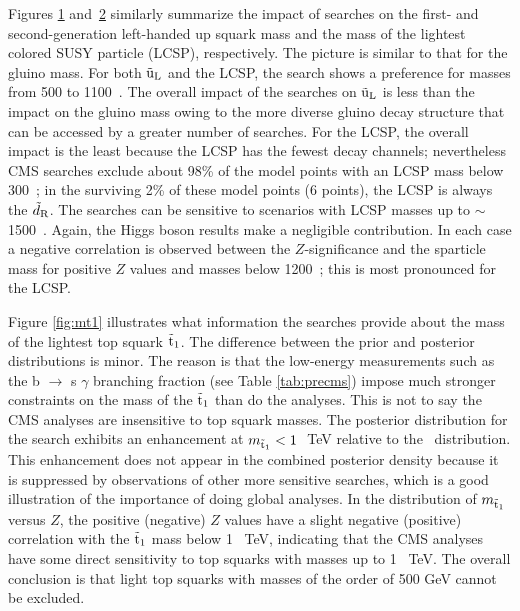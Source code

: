 
Figures \ref{fig:mq} and~\ref{fig:mLCSP} similarly summarize the impact
of searches on the first- and second-generation left-handed up squark mass and the mass of the lightest colored SUSY particle (LCSP), respectively.  The picture is similar to that for the gluino mass.  For both $\tilde{\text{u}}_\text{L}$ and the LCSP, the \MTtwo{} search shows a preference for masses from 500 to 1100~\GeV.  The overall impact of the searches on $\tilde{\text{u}}_\text{L}$ is less than the impact on the gluino mass owing to the more diverse gluino decay structure that can be accessed by a greater number of searches.  For the LCSP, the overall impact is the least  because the LCSP has the fewest decay channels; nevertheless CMS searches exclude about 98\% of the model points with an LCSP mass below 300~\GeV; in the surviving 2\% of these model points (6 points), the LCSP is always the $\tilde{d}_{\rm R}$.  The searches can be sensitive to scenarios with LCSP masses up to $\sim$1500~\GeV.  Again, the
Higgs boson results  make a negligible contribution. In each case a negative correlation is observed between the $Z$-significance and the sparticle mass for positive $Z$ values and masses below 1200~\GeV; this is most pronounced for the LCSP.

\begin{figure}[t]
    \vspace{1mm}
    \caption{}
    \label{fig:mq}
\end{figure}

\begin{figure}[t]
    \vspace{1mm}
    \caption{}
    \label{fig:mLCSP}
\end{figure}


Figure \ref{fig:mt1} illustrates what information the searches provide about the mass of the lightest top squark $\tilde{\text{t}}_1$.   
The difference between the prior and posterior distributions is minor. The reason is that the low-energy measurements such as 
 the b $\to$ s $\gamma$ branching fraction (see 
Table \ref{tab:precms}) impose much stronger constraints on the mass of the $\tilde{\text{t}}_1$ than do the analyses. 
This is not to say the CMS analyses are insensitive to top squark masses. The posterior distribution for the \MTtwo{} 
search exhibits an enhancement at $m_{\tilde{\text{t}}_1}<1~$ TeV relative to the \preCMS~distribution. This enhancement does not 
appear in the combined posterior density because it is suppressed by observations of other more sensitive searches, which is a good illustration of the importance of doing global analyses.  
 In the distribution of $m_{\tilde{\text{t}}_1}$ versus $Z$, the positive (negative) $Z$ values have a slight negative (positive) 
correlation with the $\tilde{\text{t}}_1$ mass below 1~ TeV, indicating that the CMS analyses have some 
direct sensitivity to top squarks with masses up to 1~ TeV. The overall conclusion is that light top squarks 
with masses of the order of 500 GeV cannot be excluded.
 
